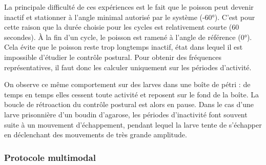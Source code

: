
La principale difficulté de ces expériences est le fait que le poisson peut devenir inactif et stationner à l'angle minimal autorisé par le système (-60°). C'est pour cette raison que la durée choisie pour les cycles est relativement courte (60 secondes). À la fin d'un cycle, le poisson est ramené à l'angle de référence (0°). Cela évite que le poisson reste trop longtemps inactif, état dans lequel il est impossible d'étudier le contrôle postural. Pour obtenir des fréquences représentatives, il faut donc les calculer uniquement sur les périodes d'activité.

On observe ce même comportement sur des larves dans une boîte de pétri : de temps en temps elles cessent toute activité et reposent sur le fond de la boîte. La boucle de rétroaction du contrôle postural est alors en pause. Dans le cas d'une larve prisonnière d'un boudin d'agarose, les périodes d'inactivité font souvent suite à un mouvement d'échappement, pendant lequel la larve tente de s'échapper en déclenchant des mouvements de très grande amplitude.

\subsubsection{Protocole multimodal}

